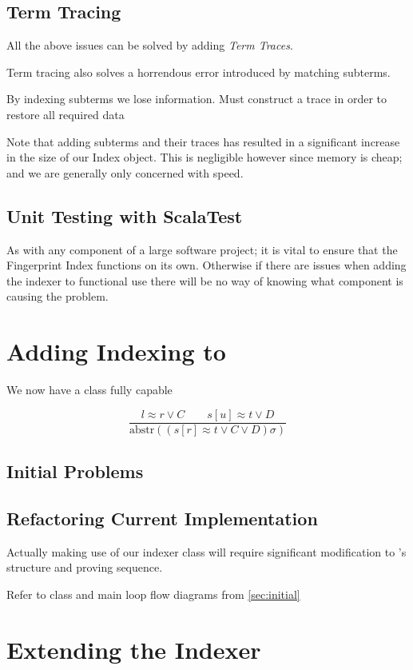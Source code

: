 \subsection{Term Tracing}

All the above issues can be solved by adding \emph{Term Traces}.

Term tracing also solves a horrendous error introduced by matching subterms. 

By indexing subterms we lose information. Must construct a trace in order
to restore all required data

Note that adding subterms and their traces has resulted in a significant increase in the
size of our Index object. This is negligible however since memory is cheap; and we are
generally only concerned with speed.

\subsection{Unit Testing with ScalaTest}

As with any component of a large software project; it is vital to ensure that the
Fingerprint Index functions on its own. Otherwise if there are issues when adding
the indexer to functional use there will be no way of knowing what component is
causing the problem.


\section{Adding Indexing to \Beagle}
We now have a class fully capable 

\[ \frac{l \approx r \lor C\quad \quad s[u] \approx t \lor D}{\text{abstr}((s[r] \approx t \lor C \lor D)\sigma)} \]


\subsection{Initial Problems}

\subsection{Refactoring Current Implementation}

Actually making use of our indexer class will require significant modification
to \beagle's structure and proving sequence.

Refer to class and main loop flow diagrams from \ref{sec:initial}


\section{Extending the Indexer}

